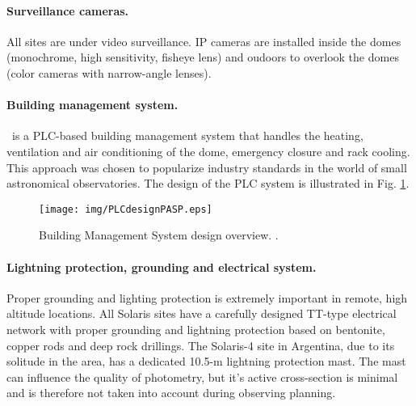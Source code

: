 \paragraph{Surveillance cameras.}

All sites are under video surveillance. IP cameras are installed inside the domes (monochrome, high sensitivity, fisheye lens) and oudoors to overlook the domes (color cameras with narrow-angle lenses). 

\paragraph{Building management system.}
\mbox{}\newline \owtm~is a PLC-based  building management system that handles the heating, ventilation and air conditioning of the dome, emergency closure and rack cooling. This approach was chosen to popularize industry standards in the world of small astronomical observatories. The design of the PLC system is illustrated in Fig. \ref{fig:PLCdesign}. 

\begin{figure}[htb!]
\begin{center}
\texttt{[image: img/PLCdesignPASP.eps]}
\caption{Building Management System design overview. \cite{Kozlowski2014}.}
\label{fig:PLCdesign}
\end{center}
\end{figure}

\paragraph{Lightning protection, grounding and electrical system.}
Proper grounding and lighting protection is extremely important in remote, high altitude locations. All Solaris sites have a carefully designed TT-type electrical network with proper grounding and lightning protection based on bentonite, copper rods and deep rock drillings. The Solaris-4 site in Argentina, due to its solitude in the area, has a dedicated 10.5-m lightning protection mast. The mast can influence the quality of photometry, but it's active cross-section is minimal and is therefore not taken into account during observing planning.


